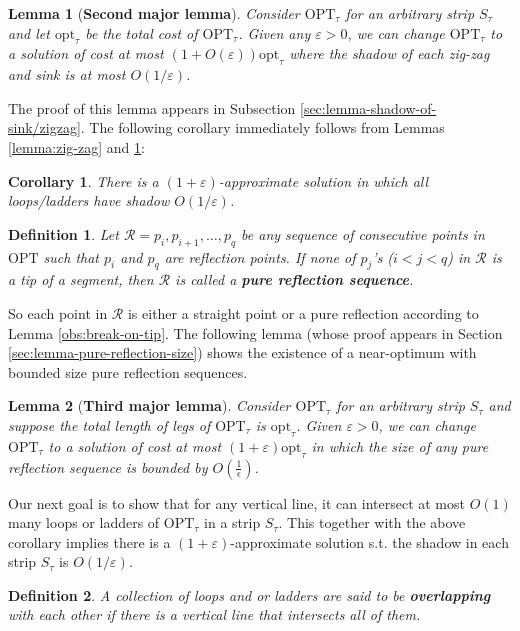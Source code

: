 \documentclass[10pt,a4paper]{amsart}
\theoremstyle{thmstyleone}
\newtheorem{lemma}{Lemma}
\newtheorem{corollary}{Corollary}
\newtheorem{definition}{Definition} %
\newcommand{\eps}{\varepsilon}
\newcommand{\opt}{{\text{opt}}}
\newcommand{\OPT}{{\text{OPT}}}
\begin{document}
\begin{lemma}[\bf Second major lemma]\label{lem:strip-bounded-shadow}
    Consider $\OPT_\tau$ for an arbitrary strip $S_\tau$ and
    let $\opt_\tau$ be the total cost of $\OPT_\tau$. Given any 
    $\eps>0$, we can change $\OPT_\tau$ to a solution of cost at most $(1+O(\eps))\opt_\tau$ where the shadow of each zig-zag and sink is at most $O(1/\eps)$.
\end{lemma}

The proof of this lemma appears in Subsection \ref{sec:lemma-shadow-of-sink/zigzag}. The following corollary immediately follows from Lemmas \ref{lemma:zig-zag} and \ref{lem:strip-bounded-shadow}:
\begin{corollary}\label{cor:loop-bounded-shadow}
    There is a $(1+\eps)$-approximate solution in which all loops/ladders have shadow $O(1/\eps)$.
\end{corollary}

\begin{definition}\label{def:pure-reflections}
    Let $\mathcal R = p_i, p_{i+1},\ldots, p_q$ be any sequence of consecutive points in $\OPT$ such that $p_i$ and $p_{q}$ are reflection points. If none of $p_j$'s ($i<j<q$) in $\mathcal R$ is a tip of a segment, then $\mathcal R$ is called a \textbf{pure reflection sequence}.
\end{definition}
So each point in $\mathcal R$ is either a straight point or a pure reflection according to Lemma \ref{obs:break-on-tip}. 
The following lemma (whose proof appears in Section \ref{sec:lemma-pure-reflection-size}) shows the existence of a near-optimum with bounded size pure reflection sequences.

\begin{lemma}[\bf Third major lemma]\label{lemma:reflections}
    Consider $\OPT_\tau$ for an arbitrary strip $S_\tau$ and suppose the total length of legs of $\OPT_\tau$ is $\opt_\tau$.
    Given $\eps>0$, we can change $\OPT_\tau$ to a solution of cost at most $(1+\eps)\opt_\tau$ in which 
    the size of any pure reflection sequence is bounded by  $O(\frac1\epsilon)$.
\end{lemma}

Our next goal is to show that for any vertical line, it can intersect at most $O(1)$ many loops or ladders of
$\OPT_\tau$ in a strip $S_\tau$. This together with the above corollary implies there is a $(1+\eps)$-approximate solution s.t. the shadow in each strip $S_\tau$ is $O(1/\eps)$.

\begin{definition}
    A collection of loops and or ladders are said to be \textbf{overlapping} with each other if there is a vertical line that intersects
    all of them.
\end{definition}
\end{document}
